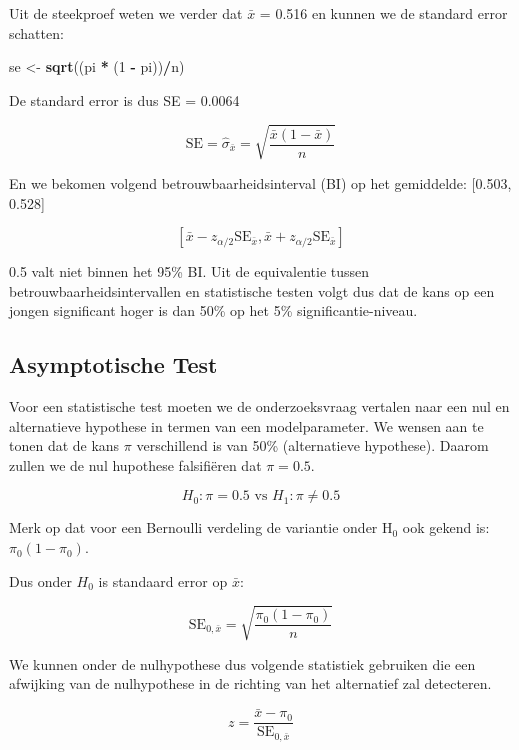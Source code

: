 \documentclass[
  12pt,dutch]{book}
\newenvironment{Shaded}{\begin{snugshade}}{\end{snugshade}}
\newcommand{\DecValTok}[1]{\textcolor[rgb]{0.00,0.00,0.81}{#1}}
\newcommand{\FunctionTok}[1]{\textcolor[rgb]{0.13,0.29,0.53}{\textbf{#1}}}
\newcommand{\NormalTok}[1]{#1}
\newcommand{\OtherTok}[1]{\textcolor[rgb]{0.56,0.35,0.01}{#1}}
\newcommand{\SpecialCharTok}[1]{\textcolor[rgb]{0.81,0.36,0.00}{\textbf{#1}}}
\theoremstyle{definition}
\theoremstyle{definition}
\theoremstyle{definition}
\theoremstyle{definition}
\theoremstyle{remark}
\begin{document}
Uit de steekproef weten we verder dat \(\bar x\) = 0.516 en kunnen we de standard error schatten:

\begin{Shaded}
\begin{Highlighting}[]
\NormalTok{se }\OtherTok{\textless{}{-}} \FunctionTok{sqrt}\NormalTok{((pi }\SpecialCharTok{*}\NormalTok{ (}\DecValTok{1} \SpecialCharTok{{-}}\NormalTok{ pi))}\SpecialCharTok{/}\NormalTok{n)}
\end{Highlighting}
\end{Shaded}

De standard error is dus SE = 0.0064

\[
\text{SE} = \hat\sigma_{\bar x} = \sqrt{\frac{\bar x(1-\bar x)}{n}} \]

En we bekomen volgend betrouwbaarheidsinterval (BI) op het gemiddelde: {[}0.503, 0.528{]}

\[ [\bar x - z_{\alpha/2} \text{SE}_{\bar x}, \bar x + z_{\alpha/2} \text{SE}_{\bar x}]\]

0.5 valt niet binnen het 95\% BI. Uit de equivalentie tussen betrouwbaarheidsintervallen en statistische testen volgt dus dat de kans op een jongen significant hoger is dan 50\% op het 5\% significantie-niveau.

\subsection{Asymptotische Test}\label{asymptotische-test}

Voor een statistische test moeten we de onderzoeksvraag vertalen naar een nul en alternatieve hypothese in termen van een modelparameter.
We wensen aan te tonen dat de kans \(\pi\) verschillend is van 50\% (alternatieve hypothese).
Daarom zullen we de nul hupothese falsifiëren dat \(\pi = 0.5\).

\[H_0: \pi = 0.5 \text{ vs } H_1: \pi \neq 0.5\]

Merk op dat voor een Bernoulli verdeling de variantie onder H\(_0\) ook gekend is: \(\pi_0 (1-\pi_0)\).

Dus onder \(H_0\) is standaard error op \(\bar x\):

\[
\text{SE}_{0, \bar x}=\sqrt{\frac{\pi_0 (1-\pi_0)}{n}}
\]

We kunnen onder de nulhypothese dus volgende statistiek gebruiken die een afwijking van de nulhypothese in de richting van het alternatief zal detecteren.

\[ z = \frac{\bar x - \pi_0}{\text{SE}_{0, \bar x}}\]
\end{document}
